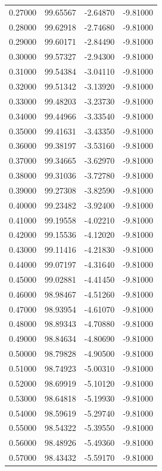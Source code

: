 \begin{table}
\begin{tabular}{llll}
0.27000 & 99.65567 & -2.64870 & -9.81000 \\
0.28000 & 99.62918 & -2.74680 & -9.81000 \\
0.29000 & 99.60171 & -2.84490 & -9.81000 \\
0.30000 & 99.57327 & -2.94300 & -9.81000 \\
0.31000 & 99.54384 & -3.04110 & -9.81000 \\
0.32000 & 99.51342 & -3.13920 & -9.81000 \\
0.33000 & 99.48203 & -3.23730 & -9.81000 \\
0.34000 & 99.44966 & -3.33540 & -9.81000 \\
0.35000 & 99.41631 & -3.43350 & -9.81000 \\
0.36000 & 99.38197 & -3.53160 & -9.81000 \\
0.37000 & 99.34665 & -3.62970 & -9.81000 \\
0.38000 & 99.31036 & -3.72780 & -9.81000 \\
0.39000 & 99.27308 & -3.82590 & -9.81000 \\
0.40000 & 99.23482 & -3.92400 & -9.81000 \\
0.41000 & 99.19558 & -4.02210 & -9.81000 \\
0.42000 & 99.15536 & -4.12020 & -9.81000 \\
0.43000 & 99.11416 & -4.21830 & -9.81000 \\
0.44000 & 99.07197 & -4.31640 & -9.81000 \\
0.45000 & 99.02881 & -4.41450 & -9.81000 \\
0.46000 & 98.98467 & -4.51260 & -9.81000 \\
0.47000 & 98.93954 & -4.61070 & -9.81000 \\
0.48000 & 98.89343 & -4.70880 & -9.81000 \\
0.49000 & 98.84634 & -4.80690 & -9.81000 \\
0.50000 & 98.79828 & -4.90500 & -9.81000 \\
0.51000 & 98.74923 & -5.00310 & -9.81000 \\
0.52000 & 98.69919 & -5.10120 & -9.81000 \\
0.53000 & 98.64818 & -5.19930 & -9.81000 \\
0.54000 & 98.59619 & -5.29740 & -9.81000 \\
0.55000 & 98.54322 & -5.39550 & -9.81000 \\
0.56000 & 98.48926 & -5.49360 & -9.81000 \\
0.57000 & 98.43432 & -5.59170 & -9.81000 \\

\end{tabular}
\end{table}
